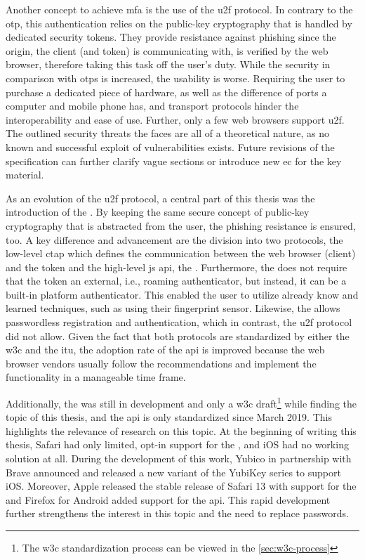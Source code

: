 Another concept to achieve \gls{mfa} is the use of the \gls{u2f} protocol. In contrary to the \gls{otp}, this authentication relies on the public-key cryptography that is handled by dedicated security tokens. They provide resistance against phishing since the origin, the client (and token) is communicating with, is verified by the web browser, therefore taking this task off the user's duty. While the security in comparison with \glspl{otp} is increased, the usability is worse. Requiring the user to purchase a dedicated piece of hardware, as well as the difference of ports a computer and mobile phone has, and transport protocols hinder the interoperability and ease of use. Further, only a few web browsers support \gls{u2f}. The outlined security threats the \wa{} faces are all of a theoretical nature, as no known and successful exploit of vulnerabilities exists. Future revisions of the specification can further clarify vague sections or introduce new \gls{ec} for the key material.

As an evolution of the \gls{u2f} protocol, a central part of this thesis was the introduction of the \wa. By keeping the same secure concept of public-key cryptography that is abstracted from the user, the phishing resistance is ensured, too. A key difference and advancement are the division into two protocols, the low-level \gls{ctap} which defines the communication between the web browser (client) and the token and the high-level \gls{js} \gls{api}, the \wa{}. Furthermore, the \wa{} does not require that the token an external, i.e., roaming authenticator, but instead, it can be a built-in platform authenticator. This enabled the user to utilize already know and learned techniques, such as using their fingerprint sensor. Likewise, the \wa{} allows passwordless registration and authentication, which in contrast, the \gls{u2f} protocol did not allow. Given the fact that both protocols are standardized by either the \gls{w3c} and the \gls{itu}, the adoption rate of the \gls{api} is improved because the web browser vendors usually follow the recommendations and implement the functionality in a manageable time frame. 

\newpage

Additionally, the \wa{} was still in development and only a \gls{w3c} draft\footnote{The \gls{w3c} standardization process can be viewed in the \autoref{sec:w3c-process}} while finding the topic of this thesis, and the \gls{api} is only standardized since March 2019. This highlights the relevance of research on this topic. At the beginning of writing this thesis, Safari had only limited, opt-in support for the \wa, and iOS had no working solution at all. During the development of this work, Yubico in partnership with Brave announced and released a new variant of the YubiKey series to support iOS. Moreover, Apple released the stable release of Safari 13 with support for the \wa{} and Firefox for Android added support for the \gls{api}. This rapid development further strengthens the interest in this topic and the need to replace passwords. 

